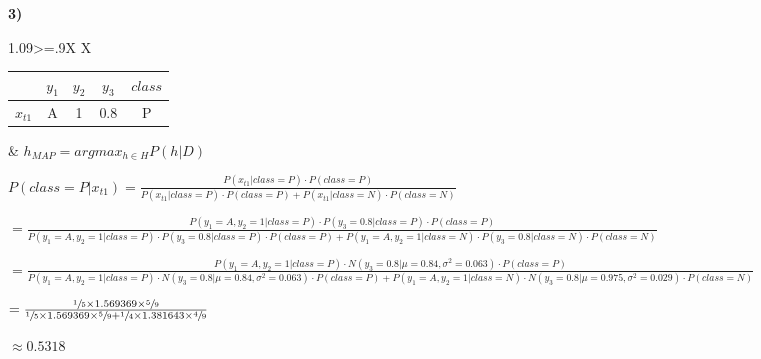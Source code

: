 \documentclass[11pt,a4paper]{article}
\begin{document}
\begin{flushleft}
  \textbf{3)} \par
  \small

  \begin{tabularx}{1.09\textwidth}{>{\hsize=.9\hsize}X X}
    \vspace{1mm}\begin{tabular}{c|c|c|c|c|}
                  \cline{2-5}
                                                 & $y_1$ & $y_2$ & $y_3$ & $class$ \\ \hline
                  \multicolumn{1}{|c|}{$x_{t1}$} & A     & 1     & 0.8   & P       \\ \hline
                \end{tabular}
     &
    $ h_{MAP} = argmax_{h \in H}P(h|D) $
  \end{tabularx} \par
  \vspace{3.5mm}\small $ P(class = P | x_{t1}) = \frac{P(x_{t1} | class = P) \cdot P(class = P)}{P(x_{t1} | class = P) \cdot P(class = P) + P(x_{t1} | class = N) \cdot P(class = N)} $ \par
  \vspace{2mm}\footnotesize $ = \frac{P(y_1 = A, y_2 = 1 | class = P) \cdot P(y_3 = 0.8 | class = P) \cdot P(class = P)}{P(y_1 = A, y_2 = 1 | class = P) \cdot P(y_3 = 0.8 | class = P) \cdot P(class = P) + P(y_1 = A, y_2 = 1 | class = N) \cdot P(y_3 = 0.8 | class = N) \cdot P(class = N)} $ \par
  \vspace{2mm}\footnotesize $ = \frac{P(y_1 = A, y_2 = 1 | class = P) \cdot N(y_3 = 0.8 | \mu = 0.84, \sigma^2 = 0.063) \cdot P(class = P)}{P(y_1 = A, y_2 = 1 | class = P) \cdot N(y_3 = 0.8 | \mu = 0.84, \sigma^2 = 0.063) \cdot P(class = P) + P(y_1 = A, y_2 = 1 | class = N) \cdot N(y_3 = 0.8 | \mu = 0.975, \sigma^2 = 0.029) \cdot P(class = N)} $ \par
  \vspace{2mm}\small $ = \frac{\sfrac{1}{5} \times 1.569369 \times \sfrac{5}{9}}{\sfrac{1}{5} \times 1.569369 \times \sfrac{5}{9} + \sfrac{1}{4} \times 1.381643 \times \sfrac{4}{9}} $ \par
  \vspace{2.5mm}\small $ \approx 0.5318 $ \par


\end{flushleft}
\end{document}
